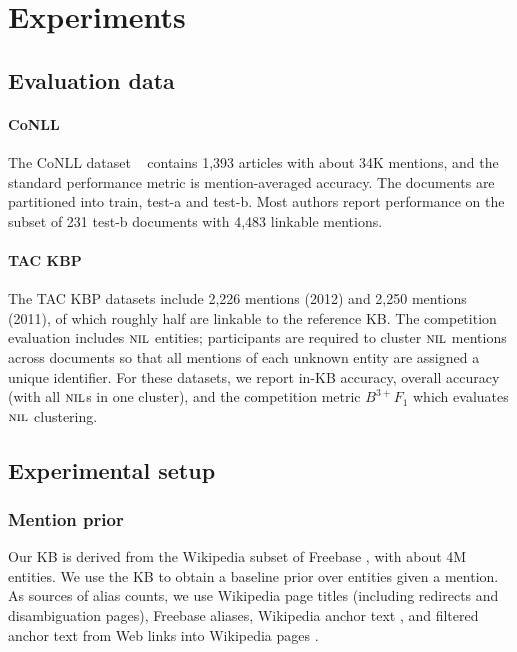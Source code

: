 \section{Experiments}
\label{sec:expt}

\subsection{Evaluation data}

\paragraph{CoNLL} 
The CoNLL dataset ~\cite{Hoffart2011} contains 1,393 articles with
about 34K mentions, and the standard performance metric is
mention-averaged accuracy.  The documents are partitioned into train,
test-a and test-b.  Most authors report performance on the subset of
231 test-b documents with 4,483 linkable mentions.

\paragraph{TAC KBP} 
The TAC KBP datasets \cite{TAC2010,TAC2011,TAC2012} include 2,226 mentions
(2012) and 2,250 mentions (2011), of which roughly half are linkable
to the reference KB.  The competition evaluation includes $\mbox{\textsc{nil}}$
entities; participants are required to cluster $\mbox{\textsc{nil}}$ mentions across
documents so that all mentions of each unknown entity are assigned a
unique identifier.  For these datasets, we report in-KB accuracy,
overall accuracy (with all $\mbox{\textsc{nil}}$s in one cluster), and the competition
metric $B^{3+} F_1$ which evaluates $\mbox{\textsc{nil}}$ clustering.

\subsection{Experimental setup}

\subsubsection{Mention prior}

Our KB is derived from the Wikipedia subset of Freebase , with about 4M entities. 
We use the KB to obtain a baseline prior over entities given a mention. As sources of alias counts, we use
Wikipedia page titles (including redirects and disambiguation pages), Freebase aliases, 
Wikipedia anchor text ,  and
 filtered anchor text from Web links into Wikipedia pages
\cite{singh12:wiki-links}.

